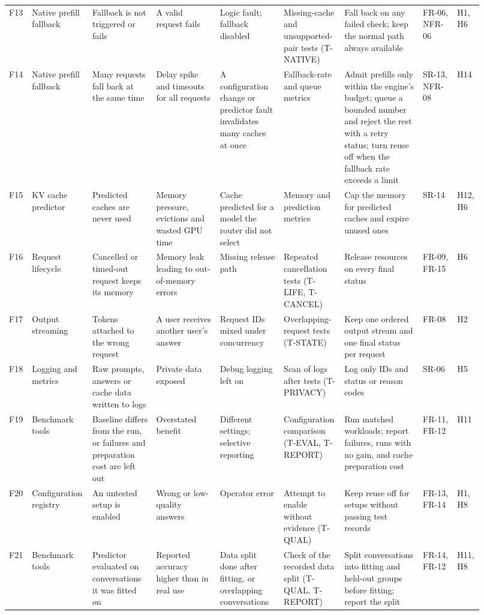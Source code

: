 \documentclass{article}
\begin{document}
\begin{landscape}
\begin{longtable}{@{}p{0.04\linewidth}p{0.10\linewidth}p{0.13\linewidth}%
p{0.13\linewidth}p{0.13\linewidth}p{0.11\linewidth}p{0.16\linewidth}%
p{0.07\linewidth}p{0.05\linewidth}@{}}
F13 & Native prefill fallback & Fallback is not triggered or fails & A
valid request fails & Logic fault; fallback disabled & Missing-cache and
unsupported-pair tests (T-NATIVE) & Fall back on any failed check; keep the
normal path always available & FR-06, NFR-06 & H1, H6\\
F14 & Native prefill fallback & Many requests fall back at the same time &
Delay spike and timeouts for all requests & A configuration change or
predictor fault invalidates many caches at once & Fallback-rate and queue
metrics & Admit prefills only within the engine's budget; queue a bounded
number and reject the rest with a retry status; turn reuse off when the
fallback rate exceeds a limit & SR-13, NFR-08 & H14\\
F15 & KV cache predictor & Predicted caches are never used & Memory
pressure, evictions and wasted GPU time & Cache predicted for a model the
router did not select & Memory and prediction metrics & Cap the memory for
predicted caches and expire unused ones & SR-14 & H12, H6\\
F16 & Request lifecycle & Cancelled or timed-out request keeps its memory
& Memory leak leading to out-of-memory errors & Missing release path &
Repeated cancellation tests (T-LIFE, T-CANCEL) & Release resources on every
final status & FR-09, FR-15 & H6\\
F17 & Output streaming & Tokens attached to the wrong request & A user
receives another user's answer & Request IDs mixed under concurrency &
Overlapping-request tests (T-STATE) & Keep one ordered output stream and one
final status per request & FR-08 & H2\\
F18 & Logging and metrics & Raw prompts, answers or cache data written to
logs & Private data exposed & Debug logging left on & Scan of logs after
tests (T-PRIVACY) & Log only IDs and status or reason codes & SR-06 & H5\\
F19 & Benchmark tools & Baseline differs from the \progname{} run, or
failures and preparation cost are left out & Overstated benefit & Different
settings; selective reporting & Configuration comparison (T-EVAL, T-REPORT)
& Run matched workloads; report failures, runs with no gain, and cache
preparation cost & FR-11, FR-12 & H11\\
F20 & Configuration registry & An untested setup is enabled & Wrong or
low-quality answers & Operator error & Attempt to enable without evidence
(T-QUAL) & Keep reuse off for setups without passing test records & FR-13,
FR-14 & H1, H8\\
F21 & Benchmark tools & Predictor evaluated on conversations it was
fitted on & Reported accuracy higher than in real use & Data split done
after fitting, or overlapping conversations & Check of the recorded data
split (T-QUAL, T-REPORT) & Split conversations into fitting and held-out
groups before fitting; report the split & FR-14, FR-12 & H11, H8\\
\bottomrule
\end{longtable}
\end{landscape}
\end{document}

